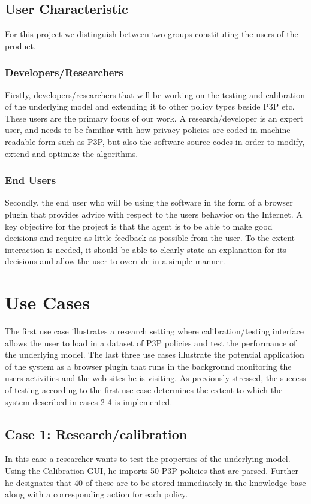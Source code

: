 \subsection{User Characteristic}

For this project we distinguish between two groups constituting the users of the product. 
\subsubsection{Developers/Researchers}
Firstly, developers/researchers that will be working on the testing and calibration of the underlying model and extending it to other policy types beside P3P etc. These users are the primary focus of our work. A research/developer is an expert user, and needs to be familiar with how privacy policies are coded in machine-readable form such as P3P, but also the software source codes in order to modify, extend and optimize the algorithms. 

\subsubsection{End Users}
Secondly, the end user who will be using the software in the form of a browser plugin that provides advice with respect to the users behavior on the Internet. A key objective for the project is that the agent is to be able to make good decisions and require as little feedback as possible from the user. To the extent interaction is needed, it should be able to clearly state an explanation for its decisions and allow the user to override in a simple manner.


\section{Use Cases}\label{useCase}

The first use case illustrates a research setting where calibration/testing interface allows the user to load in a dataset of P3P policies and test the performance of the underlying model. The last three use cases illustrate the potential application of the system as a browser plugin that runs in the background monitoring the users activities and the web sites he is visiting. As previously stressed, the success of testing according to the first use case determines the extent to which the system described in cases 2-4 is implemented.

\subsection{Case 1: Research/calibration}
In this case a researcher wants to test the properties of the underlying model. Using the Calibration GUI, he imports 50 P3P policies that are parsed. Further he designates that 40 of these are to be stored immediately in the knowledge base along with a corresponding action for each policy.

